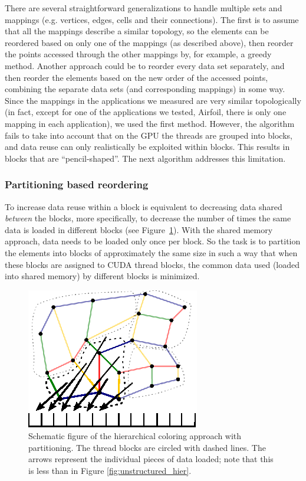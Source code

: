 There are several straightforward generalizations to handle multiple sets and
mappings (e.g. vertices, edges, cells and their connections).  The first is to
assume that all the mappings describe a similar topology, so the elements can be
reordered based on only one of the mappings (as described above), then reorder 
the points accessed through the other mappings by, for example, a greedy method.
Another approach could be to reorder every data set separately, and then reorder
the elements based on the new order of the accessed points, combining the
separate data sets (and corresponding mappings) in some way. Since the mappings
in the applications we measured are very similar topologically (in fact, except
for one of the applications we tested, Airfoil, there is only one mapping in 
each application), we used the first method. However, the algorithm fails to 
take into account that on the GPU the threads are grouped into blocks, and data 
reuse can only realistically be exploited within blocks. This results in blocks 
that are ``pencil-shaped''. The next algorithm addresses this limitation.

\subsubsection{Partitioning based reordering}

\noindent To increase data reuse within a block is equivalent to decreasing 
data shared \emph{between} the blocks, more specifically, to decrease the 
number of times the same data is loaded in different blocks (see 
Figure~\ref{fig:unstructured_part}). With the shared memory approach, data needs 
to be loaded only once per block. So the task is to partition the elements into 
blocks of approximately the same size in such a way that when these blocks are 
assigned to CUDA thread blocks, the common data used (loaded into shared 
memory) by different blocks is minimized.

\begin{figure}[Htpb]
  \centering
  \includegraphics{fig/svg/unstructured_part.eps}
  \caption{Schematic figure of the hierarchical coloring approach with
  partitioning. The thread blocks are circled with dashed lines. The arrows
  represent the individual pieces of data loaded; note that this is less than
  in Figure \ref{fig:unstructured_hier}.}
  \label{fig:unstructured_part}
\end{figure}

